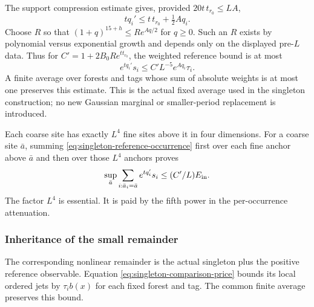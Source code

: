 The support compression estimate gives, provided
$20t\,t_{r_0}\le LA$,
\[
 tq_i'\le t\,t_{r_0}+\tfrac12 Aq_i.
\]
Choose $R$ so that $(1+q)^{15+h}\le R e^{Aq/2}$ for $q\ge0$.
Such an $R$ exists by polynomial versus exponential growth and depends
only on the displayed pre-$L$ data. Thus for
$C'=1+2B_0R e^{t t_{r_0}}$, the weighted reference bound is at most
\begin{equation}\label{eq:singleton-reference-occurrence}
            e^{tq_i'}s_i\le C'L^{-5}e^{Aq_i}\tau_i.
\end{equation}
A finite average over forests and tags whose sum of absolute weights
is at most one preserves this estimate. This is the actual fixed
average used in the singleton construction; no new Gaussian marginal
or smaller-period replacement is introduced.

Each coarse site has exactly $L^4$ fine sites above it in four dimensions.
For a coarse site $\bar a$, summing
\eqref{eq:singleton-reference-occurrence} first over each fine anchor
above $\bar a$ and then over those $L^4$ anchors proves
\begin{equation}\label{eq:singleton-reference-anchored}
 \sup_{\bar a}\sum_{i:\bar a_i=\bar a}e^{tq_i'}s_i
                                  \le (C'/L)E_{\rm in}.
\end{equation}
The factor $L^4$ is essential. It is paid by the fifth power in the
per-occurrence attenuation.

\subsubsection{Inheritance of the small remainder}
The corresponding nonlinear remainder is the actual singleton plus
the positive reference observable. Equation
\eqref{eq:singleton-comparison-price} bounds its local ordered jets
by $\tau_i b(x)$ for each fixed forest and tag. The common finite
average preserves this bound.


